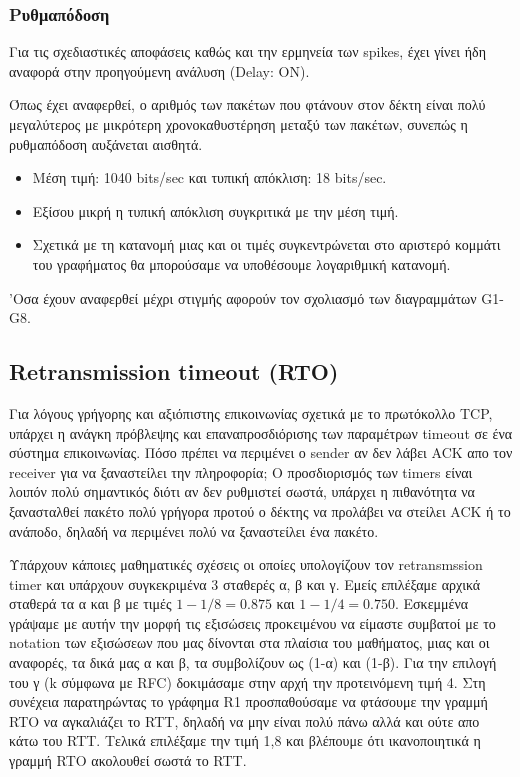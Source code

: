 \documentclass[hidelinks, 12pt, a4paper]{article}
\begin{document}
\subsubsection{Ρυθμαπόδοση}
Για τις σχεδιαστικές αποφάσεις καθώς και την ερμηνεία των spikes, έχει γίνει ήδη αναφορά στην προηγούμενη ανάλυση (Delay: ON).

Όπως έχει αναφερθεί, ο αριθμός των πακέτων που φτάνουν στον δέκτη είναι πολύ μεγαλύτερος με μικρότερη χρονοκαθυστέρηση μεταξύ των πακέτων, συνεπώς η ρυθμαπόδοση αυξάνεται αισθητά.
\begin{itemize}
    \item Μέση τιμή: 1040 bits/sec και τυπική απόκλιση: 18 bits/sec.
    \item Εξίσου μικρή η τυπική απόκλιση συγκριτικά με την μέση τιμή.
    \item Σχετικά με τη κατανομή μιας και οι τιμές συγκεντρώνεται στο αριστερό κομμάτι του γραφήματος θα μπορούσαμε να υποθέσουμε λογαριθμική κατανομή.
\end{itemize}


'Οσα έχουν αναφερθεί μέχρι στιγμής αφορούν τον σχολιασμό των διαγραμμάτων G1-G8.

\subsection{Retransmission timeout (RTO)}


Για λόγους γρήγορης και αξιόπιστης επικοινωνίας σχετικά με το πρωτόκολλο TCP, υπάρχει η ανάγκη πρόβλεψης και επαναπροσδιόρισης των παραμέτρων timeout σε ένα σύστημα επικοινωνίας. Πόσο πρέπει να περιμένει ο sender αν δεν λάβει  ACK απο τον receiver για να ξαναστείλει την πληροφορία; Ο προσδιορισμός των timers είναι λοιπόν πολύ σημαντικός διότι αν δεν ρυθμιστεί σωστά, υπάρχει η πιθανότητα να ξανασταλθεί πακέτο πολύ γρήγορα προτού ο δέκτης να προλάβει να στείλει ACΚ ή το ανάποδο, δηλαδή να περιμένει πολύ να ξαναστείλει ένα πακέτο\cite{gfg_rto, saminir}. 

Υπάρχουν κάποιες μαθηματικές σχέσεις οι οποίες υπολογίζουν τον retransmssion timer και υπάρχουν συγκεκριμένα 3 σταθερές α, β και γ. Εμείς επιλέξαμε αρχικά σταθερά τα α και β με τιμές $1 - 1/8 = 0.875$ και $1 - 1/4 = 0.750$. Εσκεμμένα γράψαμε με αυτήν την μορφή τις εξισώσεις προκειμένου να είμαστε συμβατοί με το notation των εξισώσεων που μας δίνονται στα πλαίσια του μαθήματος, μιας και οι αναφορές\cite{rfc}, τα δικά μας α και β, τα συμβολίζουν ως (1-α) και (1-β). Για την επιλογή του γ (k σύμφωνα με RFC) δοκιμάσαμε στην αρχή την προτεινόμενη τιμή 4. Στη συνέχεια παρατηρώντας το γράφημα R1 προσπαθούσαμε να φτάσουμε την γραμμή RTO να αγκαλιάζει το RTT, δηλαδή να μην είναι πολύ πάνω αλλά και ούτε απο κάτω του RTT. Τελικά επιλέξαμε την τιμή 1,8 και βλέπουμε ότι ικανοποιητικά η γραμμή RTO ακολουθεί σωστά το RTT.
\end{document}
